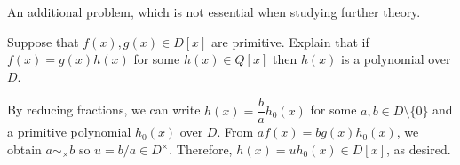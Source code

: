 An additional problem, which is not essential when studying further theory.
\begin{prob}\label{cyclotomic_poly_over_Z}
    Suppose that $f(x), g(x)\in D[x]$ are primitive.
    Explain that if $f(x)=g(x)h(x)$ for some $h(x)\in Q[x]$ then $h(x)$ is a polynomial over $D$.
\end{prob}
\begin{sol}
    By reducing fractions, we can write $h(x)=\dfrac{b}{a}h_0(x)$ for some $a, b\in D\setminus\{0\}$ and a primitive polynomial $h_0(x)$ over $D$.
    From $af(x)=bg(x)h_0(x)$, we obtain $a\sim_\times b$ so $u=b/a\in D^\times$.
    Therefore, $h(x)=uh_0(x)\in D[x]$, as desired.
\end{sol}